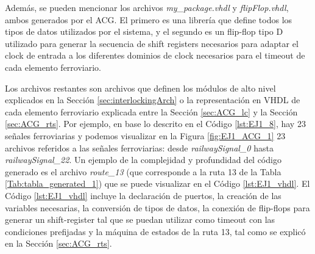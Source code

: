 	Además, se pueden mencionar los archivos \textit{my\_package.vhdl} y \textit{flipFlop.vhdl}, ambos generados por el ACG. El primero es una librería que define todos los tipos de datos utilizados por el sistema, y el segundo es un flip-flop tipo D utilizado para generar la secuencia de shift registers necesarios para adaptar el clock de entrada a los diferentes dominios de clock necesarios para el timeout de cada elemento ferroviario.
	
	Los archivos restantes son archivos que definen los módulos de alto nivel explicados en la Sección \ref{sec:interlockingArch} o la representación en VHDL de cada elemento ferroviario explicada entre la Sección \ref{sec:ACG_lc} y la Sección \ref{sec:ACG_rts}. Por ejemplo, en base lo descrito en el Código \ref{lst:EJ1_8}, hay 23 señales ferroviarias y podemos visualizar en la Figura \ref{fig:EJ1_ACG_1} 23 archivos referidos a las señales ferroviarias: desde \textit{railwaySignal\_0} hasta \textit{railwaySignal\_22}. Un ejemplo de la complejidad y profundidad del código generado es el archivo \textit{route\_13} (que corresponde a la ruta 13 de la Tabla \ref{Tab:tabla_generated_1}) que se puede visualizar en el Código \ref{lst:EJ1_vhdl}.	El Código \ref{lst:EJ1_vhdl} incluye la declaración de puertos, la creación de las variables necesarias, la conversión de tipos de datos, la conexión de flip-flops para generar un shift-register tal que se puedan utilizar como timeout con las condiciones prefijadas y la máquina de estados de la ruta 13, tal como se explicó en la Sección \ref{sec:ACG_rts}.
	
